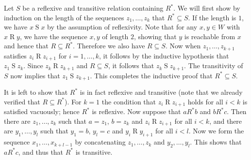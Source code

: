 \documentclass{article}
\begin{document}
\begin{ex}
Let $S$ be a reflexive and transitive relation containing $R^\ast$. We will first show by induction on the length of the sequences $z_1,\ldots,z_k$ that $R^\ast\subseteq S$. If the length is $1$, we have $x\mathbin{S} x$ by the assumption of reflexivity. Note that for any $x,y\in W$ with $x\mathbin{R}y$, we have the sequence $x,y$ of length $2$, showing that $y$ is reachable from $x$ and hence that $R\subseteq R^\ast$. Therefore we also have $R\subseteq S$. Now when $z_1,\ldots,z_{k+1}$ satisfies $z_i\mathbin{R}z_{i+1}$ for $i=1,\ldots,k$, it follows by the inductive hypothesis that $z_1\mathbin{S} z_k$. Since $z_k\mathbin{R} z_{k+1}$ and $R\subseteq S$, it follows that $z_k\mathbin{S} z_{k+1}$. The transitivity of $S$ now implies that $z_1\mathbin{S}z_{k+1}$. This completes the inductive proof that $R^\ast\subseteq S$.

It is left to show that $R^\ast$ is in fact reflexive and transitive (note that we already verified that $R\subseteq R^\ast$). For $k=1$ the condition that $z_i\mathbin{R}z_{i+1}$ holds for all $i<k$ is satisfied vacuously; hence $R^\ast$ is reflexive. Now suppose that $a\mathbin{R^\ast}b$ and $b\mathbin{R^\ast}c$. Then there are $z_1,\ldots,z_k$ such that $a=z_1$, $b=z_k$ and $z_i\mathbin{R}z_{i+1}$ for all $i<k$, and there are $y_1,\ldots,y_l$ such that $y_1=b$, $y_l=c$ and $y_i\mathbin{R}y_{i+1}$ for all $i<l$. Now we form the sequence $x_1,\ldots,x_{k+l-1}$ by concatenating $z_1,\ldots,z_k$ and $y_2,\ldots,y_l$. This shows that $a\mathbin{R^\ast}c$, and thus that $R^\ast$ is transitive.
\end{ex}
\end{document}
